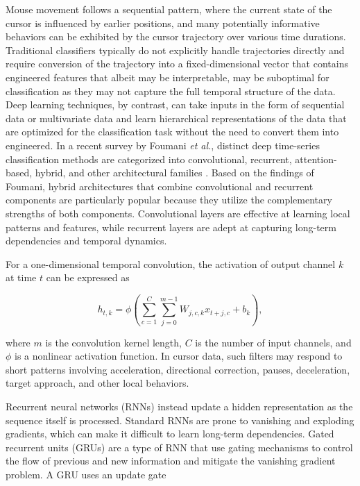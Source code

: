 \documentclass[conference]{IEEEtran}
\begin{document}
Mouse movement follows a sequential pattern, where the current state of the cursor is influenced by earlier positions, and many potentially informative behaviors can be exhibited by the cursor trajectory over various time durations. Traditional classifiers typically do not explicitly handle trajectories directly and require conversion of the trajectory into a fixed-dimensional vector that contains engineered features that albeit may be interpretable, may be suboptimal for classification as they may not capture the full temporal structure of the data. Deep learning techniques, by contrast, can take inputs in the form of sequential data or multivariate data and learn hierarchical representations of the data that are optimized for the classification task without the need to convert them into engineered. In a recent survey by Foumani \textit{et al.}, distinct deep time-series classification methods are categorized into convolutional, recurrent, attention-based, hybrid, and other architectural families \cite{foumaniTimeSeriesSurvey}. Based on the findings of Foumani, hybrid architectures that combine convolutional and recurrent components are particularly popular because they utilize the complementary strengths of both components. Convolutional layers are effective at learning local patterns and features, while recurrent layers are adept at capturing long-term dependencies and temporal dynamics.

For a one-dimensional temporal convolution, the activation of output channel $k$ at time $t$ can be expressed as

\begin{equation}
h_{t,k}
=
\phi
\left(
\sum_{c=1}^{C}
\sum_{j=0}^{m-1}
W_{j,c,k}x_{t+j,c}
+
b_k
\right),
\label{eq:temporal_convolution}
\end{equation}

where $m$ is the convolution kernel length, $C$ is the number of input channels, and $\phi$ is a nonlinear activation function. In cursor data, such filters may respond to short patterns involving acceleration, directional correction, pauses, deceleration, target approach, and other local behaviors. 

Recurrent neural networks (RNNs) instead update a hidden representation as the sequence itself is processed. Standard RNNs are prone to vanishing and exploding gradients, which can make it difficult to learn long-term dependencies. Gated recurrent units (GRUs) are a type of RNN that use gating mechanisms to control the flow of previous and new information and mitigate the vanishing gradient problem. A GRU uses an update gate
\end{document}
